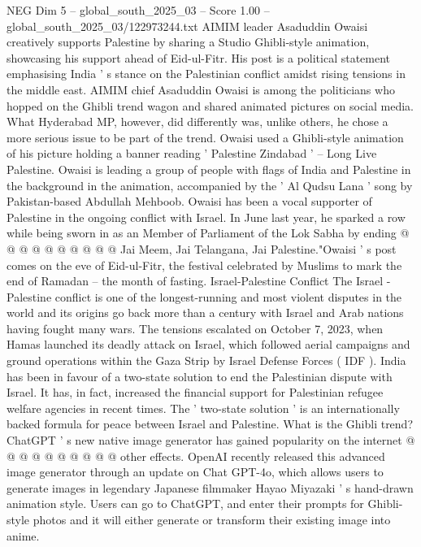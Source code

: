 \begin{textsample}{NEG Dim 5 – global\_south\_2025\_03 – Score 1.00 – global\_south\_2025\_03/122973244.txt}  \label{ex:f5_neg_278}
AIMIM leader Asaduddin Owaisi creatively supports Palestine by sharing a Studio Ghibli-style animation, showcasing his support ahead of Eid-ul-Fitr.
His post is a political statement emphasising India ' s stance on the Palestinian conflict amidst rising tensions in the middle east.
AIMIM chief Asaduddin Owaisi is among the politicians who hopped on the Ghibli trend wagon and shared animated pictures on social media.
What Hyderabad MP, however, did differently was, unlike others, he chose a more serious issue to be part of the trend.
Owaisi used a Ghibli-style animation of his picture holding a banner reading ' Palestine Zindabad ' -- Long Live Palestine.
Owaisi is leading a group of people with flags of India and Palestine in the background in the animation, accompanied by the ' Al Qudsu Lana ' song by Pakistan-based Abdullah Mehboob.
Owaisi has been a vocal supporter of Palestine in the ongoing conflict with Israel.
In June last year, he sparked a row while being sworn in as an Member of Parliament of the Lok Sabha by ending @ @ @ @ @ @ @ @ @ @ Jai Meem, Jai Telangana, Jai Palestine."Owaisi ' s post comes on the eve of Eid-ul-Fitr, the festival celebrated by Muslims to mark the end of Ramadan -- the month of fasting.
Israel-Palestine Conflict The Israel - Palestine conflict is one of the longest-running and most violent disputes in the world and its origins go back more than a century with Israel and Arab nations having fought many wars.
The tensions escalated on October 7, 2023, when Hamas launched its deadly attack on Israel, which followed aerial campaigns and ground operations within the Gaza Strip by Israel Defense Forces ( IDF ).
India has been in favour of a two-state solution to end the Palestinian dispute with Israel.
It has, in fact, increased the financial support for Palestinian refugee welfare agencies in recent times.
The ' two-state solution ' is an internationally backed formula for peace between Israel and Palestine.
What is the Ghibli trend?
ChatGPT ' s new native image generator has gained popularity on the internet @ @ @ @ @ @ @ @ @ @ other effects.
OpenAI recently released this advanced image generator through an update on Chat GPT-4o, which allows users to generate images in legendary Japanese filmmaker Hayao Miyazaki ' s hand-drawn animation style.
Users can go to ChatGPT, and enter their prompts for Ghibli-style photos and it will either generate or transform their existing image into anime.

\end{textsample}
